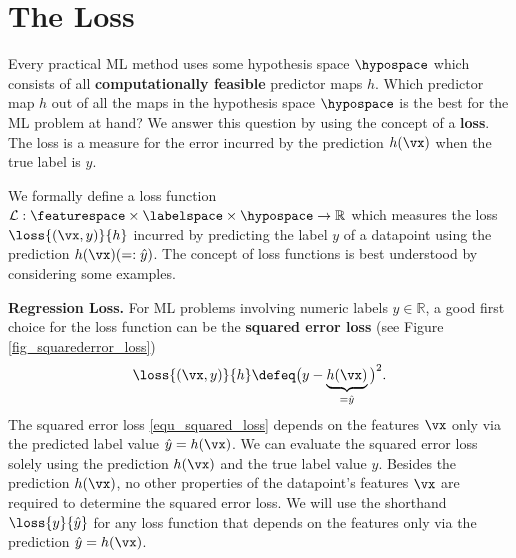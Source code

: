 \documentclass[12pt]{report}
\begin{document}
\section{The Loss}
\label{sec_lossfct}

Every practical ML method uses some hypothesis space $\hypospace$ 
which consists of all {\bf computationally feasible} predictor maps $h$. 
Which predictor map $h$ out of all the maps in the hypothesis space 
$\hypospace$ is the best for the ML problem at hand? We answer this 
question by using the concept of a {\bf loss}. The loss is a measure for 
the error  incurred by the prediction $h(\vx)$ when the true label is $y$. 

We formally define a loss function $\mathcal{L}: \featurespace \times \labelspace \times \hypospace \rightarrow \mathbb{R}$ 
which measures the loss $\loss{(\vx,y)}{h}$ incurred by predicting the 
label $y$ of a datapoint using the prediction $h(\vx)(=: \hat{y})$. 
The concept of loss functions is best understood by considering 
some examples. 

{\bf Regression Loss.} For ML problems involving numeric labels $y \in \mathbb{R}$, 
a good first choice for the loss function can be the {\bf squared error loss} (see Figure \ref{fig_squarederror_loss}) 
\begin{equation} 
\label{equ_squared_loss}
\loss{(\vx,y)}{h} \defeq \big(y - \underbrace{h(\vx)}_{=\hat{y}} \big)^{2}. 
\end{equation} 
The squared error loss \eqref{equ_squared_loss} depends on the 
features $\vx$ only via the predicted label value $\hat{y}= h(\vx)$. 
We can evaluate the squared error loss solely using the prediction $h(\vx)$ 
and the true label value $y$. Besides the prediction $h(\vx)$, no other 
properties of the datapoint's features $\vx$ are required to determine 
the squared error loss. We will use the shorthand $\loss{y}{\hat{y}}$ 
for any loss function that depends on the features only via the 
prediction $\hat{y}=h(\vx)$. 
\end{document}

